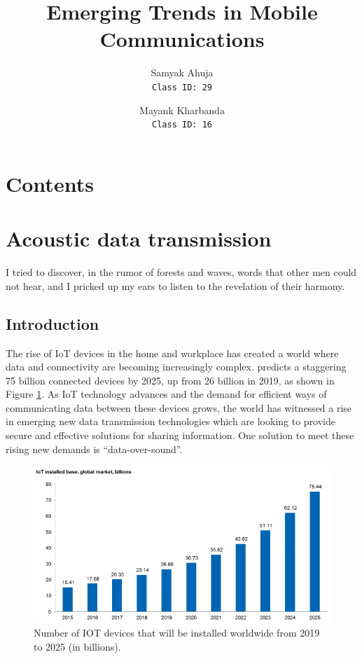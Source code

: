 \documentclass[notitlepage,hidelinks]{article}
\title{Emerging Trends in Mobile Communications}
\author{
    Samyak Ahuja \\
    \texttt{Class ID: 29}
    \and
    Mayank Kharbanda \\
    \texttt{Class ID: 16}
}
\makeatletter
\newcommand*{\toccontents}{\@starttoc{toc}}
\makeatother
\begin{document}
\vspace{0.5in}
\maketitle

\vspace{1in}
\section*{Contents}
\toccontents
\newpage


\section{Acoustic data transmission}
\epigraph{ I tried to discover, in the rumor of forests and waves, words
that other men could not hear, and I pricked up my ears to listen to the
revelation of their harmony.}{\textcite{november05}}

\subsection{Introduction}
The rise of IoT devices in the home and workplace has created a world where
data and connectivity are becoming increasingly complex. \textcite{ihs16}
predicts a staggering 75 billion connected devices by 2025, up from 26 billion
in 2019, as shown in Figure \ref{fig:ihs_iot}.  As IoT technology advances and the
demand for efficient ways of communicating data between these devices grows,
the world has witnessed a rise in emerging new data transmission technologies
which are looking to provide secure and effective solutions for sharing
information. One solution to meet these rising new demands is “data-over-sound”.

\begin{figure}[!h]
  \includegraphics[width=\linewidth]{res/iot_market_trend.png}
    \caption{Number of IOT devices that will be installed worldwide from 2019
    to 2025 (in billions).}
  \label{fig:ihs_iot}
\end{figure}
\end{document}

